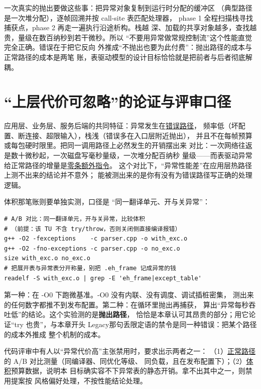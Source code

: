 \documentclass[12pt,a4paper,fontset=fandol]{ctexbook}
\newcommand{\Lang}[1]{\textsf{#1}}
\newcommand{\DomTra}{\Lang{Legacy}}
\begin{document}
一次真实的抛出要做这些事：把异常对象复制到运行时分配的缓冲区
（典型路径是一次堆分配），逐帧回溯并按 call-site 表匹配处理器，
phase 1 全程扫描栈寻找捕获点，phase 2 再走一遍执行沿途析构。栈越
深、加载的共享对象越多，查找越贵，量级在数百纳秒到若干微秒。所以
``不要用异常做常规控制流''这个性能直觉完全正确。错误在于把它反向
外推成``不抛出也要为此付费''：抛出路径的成本与正常路径的成本是两笔
账，表驱动模型的设计目标恰恰就是把前者与后者彻底解耦。

\section{``上层代价可忽略''的论证与评审口径}
\label{sec:ch10-upper}

应用层、业务层、服务后端的共同特征：异常发生在\underline{错误路径}，
频率低（坏配置、断连接、超限输入），栈浅（错误多在入口层附近抛出），
并且不在每帧预算或每包硬时限里。把同一调用路径上必然发生的开销摆出来
对比：一次网络往返是数十微秒起，一次磁盘写毫秒量级，一次堆分配百纳秒
量级——而表驱动异常给正常路径的增量是\underline{零条额外指令}。
这个对比下，``异常性能差''在应用层热路径上测不出来的结论并不意外；
能被测出来的是你有没有为错误路径写正确的处理逻辑。

体积那笔账则要单独实测，口径是 ``同一翻译单元、开与关异常''：

\begin{lstlisting}[style=shellstyle]
# A/B 对比：同一翻译单元，开与关异常，比较体积
# （前提：该 TU 不含 try/throw，否则关闭侧直接编译报错）
g++ -O2 -fexceptions    -c parser.cpp -o with_exc.o
g++ -O2 -fno-exceptions -c parser.cpp -o no_exc.o
size with_exc.o no_exc.o
# 把展开表与异常表分开称量，别把 .eh_frame 记成异常的钱
readelf -S with_exc.o | grep -E 'eh_frame|except_table'
\end{lstlisting}

\begin{warning}[title={证明``异常慢''的两种经典实验错误}]
第一种：在 -O0 下跑微基准。-O0 没有内联、没有调度、调试插桩密集，
测出来的任何数字都推不到发布配置。第二种：在循环里抛出再捕获，
算出``异常每秒吞吐低''的结论。这个实验测的是\textbf{抛出路径}，
恰恰是本章认可其昂贵的部分；用它论证``try 也贵''，与本章开头
\DomTra 那句丢限定语的禁令是同一种错误：把某个路径的成本外推成
整个机制的成本。
\end{warning}

\begin{guideline}[title={评审口径：主张禁用者举证}]
代码评审中有人以``异常代价高''主张禁用时，要求出示两者之一：
（1）\underline{正常路径}的 A/B 对比测量（同编译器、同优化等级、
同负载，且在发布配置下）；（2）\underline{体积}预算数据，说明本
目标确实容不下异常表的静态开销。拿不出其中之一，则禁用提案按
风格偏好处理，不按性能结论处理。
\end{guideline}
\end{document}
